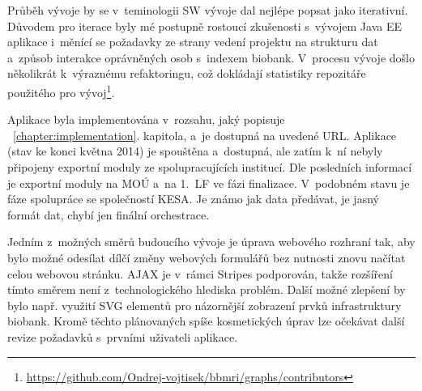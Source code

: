 \documentclass[11pt, final, oneside]{fithesis2}
\begin{document}
Průběh vývoje by se v~teminologii SW vývoje dal nejlépe popsat jako iterativní. Důvodem pro iterace byly mé postupně rostoucí zkušenosti s~vývojem Java EE aplikace i~měnící se požadavky ze strany vedení projektu na strukturu dat a~způsob interakce oprávněných osob s~indexem biobank. V~procesu vývoje došlo několikrát k~výraznému refaktoringu, což dokládají statistiky repozitáře použitého pro vývoj\footnote{\url{https://github.com/Ondrej-vojtisek/bbmri/graphs/contributors}}.

Aplikace byla implementována v~rozsahu, jaký popisuje ~\ref{chapter:implementation}. kapitola, a~je dostupná na uvedené URL. 
Aplikace (stav ke konci května 2014) je spouštěna a~dostupná, ale zatím k~ní nebyly připojeny exportní moduly ze spolupracujících institucí. Dle posledních informací je exportní moduly na MOÚ a~na 1.~LF ve fázi finalizace. V~podobném stavu je fáze spolupráce se společností KESA. Je známo jak data předávat, je jasný formát dat, chybí jen finální orchestrace. 

Jedním z~možných směrů budoucího vývoje je úprava webového rozhraní tak, aby bylo možné odesílat dílčí změny webových formulářů bez nutnosti znovu načítat celou webovou stránku. AJAX je v~rámci Stripes podporován, takže rozšíření tímto směrem není z~technologického hlediska problém. Další možné zlepšení by bylo např. využití SVG elementů pro názornější zobrazení prvků infrastruktury biobank. Kromě těchto plánovaných spíše kosmetických úprav lze očekávat další revize požadavků s~prvními uživateli aplikace.




\renewcommand{\UrlBreaks}{\do\/\do\a\do\b\do\c\do\e\do\f\do\i\do\j\do\k\do\l\do\m\do\n\do\o\do\q\do\r\do\s\do\u\do\v\do\w\do\x\do\y\do\z\do\A\do\B\do\C\do\D\do\E\do\F\do\G\do\H\do\I\do\J\do\K\do\L\do\M\do\N\do\O\do\P\do\Q\do\R\do\S\do\T\do\U\do\V\do\W\do\X\do\Y\do\Z\do\?\do\=\do\-\do\0\do\1\do\3\do\4\do\5\do\6\do\7\do\8\do\9\do\p\do\d\do\h}
\mathchardef{}\relax
\end{document}
